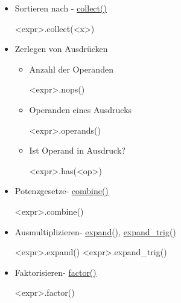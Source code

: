 \documentclass[a4paper,9pt,DIV15,twocolumn]{scrartcl}
\begin{document}
  \begin{itemize}

      
      \item Sortieren nach - \href{https://sage.math.uni-goettingen.de/doc/static/reference/sage/symbolic/expression.html?highlight=simplify_full#sage.symbolic.expression.Expression.collect}{collect()}
       \begin{sagein}
<expr>.collect(<x>)  
       \end{sagein}
		 \item Zerlegen von Ausdr\"ucken
			 \begin{itemize}
				\item Anzahl der Operanden
					\begin{sagein}
<expr>.nops()
					\end{sagein}
				\item Operanden eines Ausdrucks
					\begin{sagein}
<expr>.operands()
					\end{sagein}
				\item Ist Operand in Ausdruck?
					\begin{sagein}
<expr>.has(<op>)
					\end{sagein}
				\end{itemize}
		 \item  Potenzgesetze- \href{https://sage.math.uni-goettingen.de/doc/static/reference/sage/symbolic/expression.html?highlight=simplify_full#sage.symbolic.expression.Expression.combine}{combine()}
       \begin{sagein}
<expr>.combine() 
       \end{sagein}
		 \item Ausmultiplizieren- \href{https://sage.math.uni-goettingen.de/doc/static/reference/sage/symbolic/expression.html?highlight=simplify_full#sage.symbolic.expression.Expression.expand}{expand()}, \href{https://sage.math.uni-goettingen.de/doc/static/reference/calculus/sage/symbolic/expression.html#sage.symbolic.expression.Expression.expand_trig}{expand\_trig()}
       \begin{sagein}
<expr>.expand() 
<expr>.expand_trig()
       \end{sagein}
   \item Faktorisieren- \href{https://sage.math.uni-goettingen.de/doc/static/reference/sage/symbolic/expression.html?highlight=simplify_full#sage.symbolic.expression.Expression.factor}{factor()}
       \begin{sagein}
<expr>.factor()  
       \end{sagein}

\end{itemize}
\end{document}

